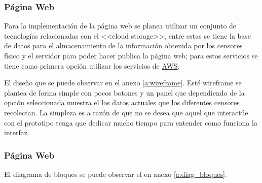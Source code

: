 \subsubsection{Página Web}
Para la implementación de la página web se planea utilizar un conjunto de
tecnologías relacionadas con el <<cloud storage>>, entre estas se tiene la base
de datos para el almacenamiento de la información obtenida por los censores
físico y el servidor para poder hacer publica la página web; para estos
servicios se tiene como primera opción utilizar los servicios de
\href{https://aws.amazon.com/}{AWS}.

El diseño que se puede observar en el anexo \ref{a:wireframe}. Esté wireframe
se plantea de forma simple con pocos botones y un panel que dependiendo de la
opción seleccionada muestra el los datos actuales que los diferentes censores
recolectan. La simpleza es a razón de que no se desea que aquel que interactúe
con el prototipo tenga que dedicar mucho tiempo para entender como funciona la
interfaz.

\subsubsection{Página Web}
El diagrama de bloques se puede observar el en anexo \ref{a:diag_bloques}.
